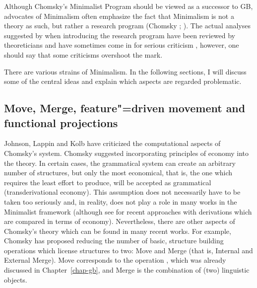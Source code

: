 Although Chomsky's Minimalist Program should be viewed as a successor to GB, advocates of Minimalism often emphasize the fact that Minimalism is not
a theory as such, but rather a research program (Chomsky \citeyear[]{Chomsky2007a};
\citeyear[]{Chomsky2013a}). The actual analyses suggested by \citet{Chomsky95a-u} when introducing the research program have been reviewed by theoreticians and have sometimes come in for serious criticism
\citep*{Kolb97a,JL97a-u-platte,JL99a-u-gekauft,LLJ2000b,LLJ2000a,LLJ2001a,Seuren2004a,PJ2005a},
however, one should say that some criticisms overshoot the mark.

There are various strains of Minimalism. In the following sections, I will discuss some of the
central ideas and explain which aspects are regarded problematic.

\subsection{Move, Merge, feature"=driven movement and functional projections}
\label{Abschnitt-merkmalsgetriebene-Bewegung}
\label{Abschnitt-MP-funktionale-Projektionen}\label{sec-functional-projections-minimalism}
\label{Abschnitt-Kaynesche-Modelle}

Johnson, Lappin and Kolb have criticized the computational aspects of Chomsky's system. Chomsky suggested incorporating principles of economy into
the theory. In certain cases, the grammatical system can create an arbitrary number of structures, but only the most economical, that is, the one which
requires the least effort to produce, will be accepted as grammatical (transderivational economy). This assumption
does not necessarily have to be taken too seriously and, in reality, does not play a role in many works in the Minimalist framework (although see
\citet{Richards2015a} for recent approaches with derivations which are compared in terms of economy). Nevertheless, there are other aspects of 
Chomsky's theory which can be found in many recent works. For example, Chomsky has proposed reducing
the number of basic, structure building operations which license structures to two: Move and Merge (that is, Internal and External Merge).
Move corresponds to the operation \movea, which was already discussed in Chapter~\ref{chap-gb}, and
Merge is the combination of (two) linguistic objects.

